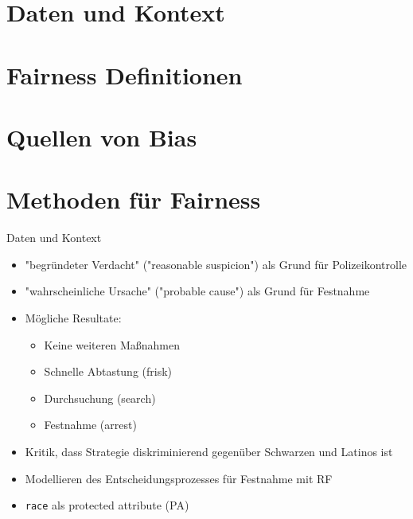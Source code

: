 \documentclass[aspectratio=169]{beamer}
\begin{document}
\section{Daten und Kontext}
\section{Fairness Definitionen}
\section{Quellen von Bias}
\section{Methoden für Fairness}

\begin{frame}{Daten und Kontext}
	\begin{itemize}
		\item "begründeter Verdacht" ("reasonable suspicion") als Grund für Polizeikontrolle
		\item "wahrscheinliche Ursache" ("probable cause") als Grund für Festnahme
		\item Mögliche Resultate:
		\begin{itemize}
			\item Keine weiteren Maßnahmen
			\item Schnelle Abtastung (frisk)
			\item Durchsuchung (search)
			\item Festnahme (arrest)
		\end{itemize}
		\item Kritik, dass Strategie diskriminierend gegenüber Schwarzen und Latinos ist
		\item Modellieren des Entscheidungsprozesses für Festnahme mit RF
		\item \texttt{race} als protected attribute (PA)
	\end{itemize}
\end{frame}
	
\end{document}
